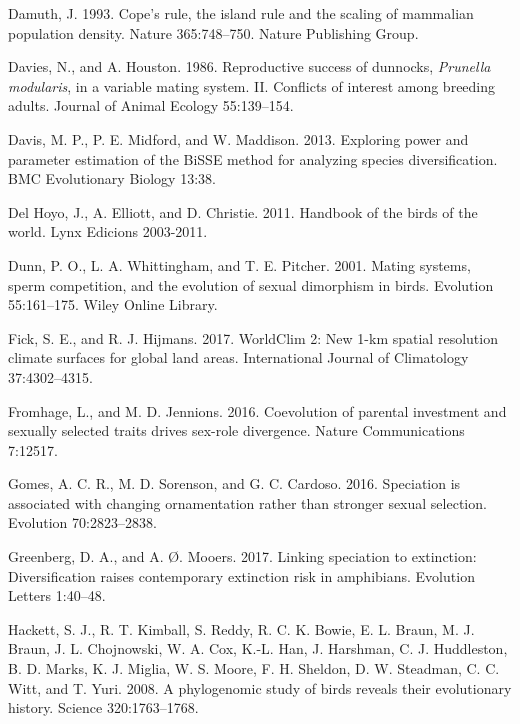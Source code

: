 \documentclass[]{article}
\begin{document}
\leavevmode\hypertarget{ref-Damuth_1993}{}%
Damuth, J. 1993. Cope's rule, the island rule and the scaling of
mammalian population density. Nature 365:748--750. Nature Publishing
Group.

\leavevmode\hypertarget{ref-davies1986re}{}%
Davies, N., and A. Houston. 1986. Reproductive success of dunnocks,
\emph{Prunella modularis}, in a variable mating system. II. Conflicts of
interest among breeding adults. Journal of Animal Ecology 55:139--154.

\leavevmode\hypertarget{ref-Davis_2013}{}%
Davis, M. P., P. E. Midford, and W. Maddison. 2013. Exploring power and
parameter estimation of the BiSSE method for analyzing species
diversification. BMC Evolutionary Biology 13:38.

\leavevmode\hypertarget{ref-delhoyo2011}{}%
Del Hoyo, J., A. Elliott, and D. Christie. 2011. Handbook of the birds
of the world. Lynx Edicions 2003-2011.

\leavevmode\hypertarget{ref-dunn_2001}{}%
Dunn, P. O., L. A. Whittingham, and T. E. Pitcher. 2001. Mating systems,
sperm competition, and the evolution of sexual dimorphism in birds.
Evolution 55:161--175. Wiley Online Library.

\leavevmode\hypertarget{ref-Fick_2017}{}%
Fick, S. E., and R. J. Hijmans. 2017. WorldClim 2: New 1-km spatial
resolution climate surfaces for global land areas. International Journal
of Climatology 37:4302--4315.

\leavevmode\hypertarget{ref-Fromhage_2016}{}%
Fromhage, L., and M. D. Jennions. 2016. Coevolution of parental
investment and sexually selected traits drives sex-role divergence.
Nature Communications 7:12517.

\leavevmode\hypertarget{ref-Gomes_2016}{}%
Gomes, A. C. R., M. D. Sorenson, and G. C. Cardoso. 2016. Speciation is
associated with changing ornamentation rather than stronger sexual
selection. Evolution 70:2823--2838.

\leavevmode\hypertarget{ref-Greenberg_2017}{}%
Greenberg, D. A., and A. Ø. Mooers. 2017. Linking speciation to
extinction: Diversification raises contemporary extinction risk in
amphibians. Evolution Letters 1:40--48.

\leavevmode\hypertarget{ref-Hackett_2008}{}%
Hackett, S. J., R. T. Kimball, S. Reddy, R. C. K. Bowie, E. L. Braun, M.
J. Braun, J. L. Chojnowski, W. A. Cox, K.-L. Han, J. Harshman, C. J.
Huddleston, B. D. Marks, K. J. Miglia, W. S. Moore, F. H. Sheldon, D. W.
Steadman, C. C. Witt, and T. Yuri. 2008. A phylogenomic study of birds
reveals their evolutionary history. Science 320:1763--1768.
\end{document}
